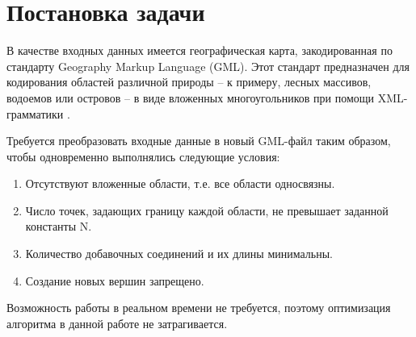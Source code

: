 \section{Постановка задачи}
\label{}

В качестве входных данных имеется географическая карта, закодированная по стандарту Geography Markup Language (GML). Этот стандарт предназначен для кодирования областей различной природы – к примеру, лесных массивов, водоемов или островов – в виде вложенных многоугольников при помощи XML-грамматики \cite{noauthor_geography_nodate}. 

Требуется преобразовать входные данные в новый GML-файл таким образом, чтобы одновременно выполнялись следующие условия:

\begin{enumerate}
\item Отсутствуют вложенные области, т.е. все области односвязны.
\item Число точек, задающих границу каждой области, не превышает заданной константы N.
\item Количество добавочных соединений и их длины минимальны.
\item Создание новых вершин запрещено.
\end{enumerate}

Возможность работы в реальном времени не требуется, поэтому оптимизация алгоритма в данной работе не затрагивается.